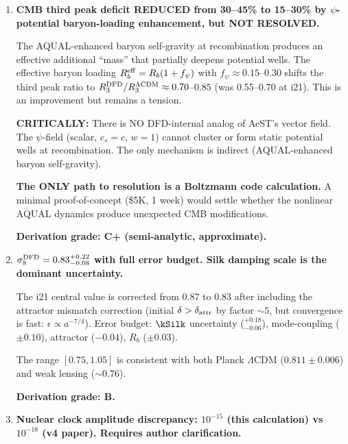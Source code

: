 \documentclass[11pt]{article}
\newcommand{\LCDM}{$\Lambda$CDM}
\begin{document}
\begin{tcolorbox}[colback=blue!5!white, colframe=blue!70!black,
  title=\textbf{W4i22 TOP 5 FINDINGS (RANKED BY IMPACT)}]

\begin{enumerate}[label=\textbf{F\arabic*.}]

\item \textbf{CMB third peak deficit REDUCED from 30--45\% to 15--30\%
  by $\psi$-potential baryon-loading enhancement, but NOT RESOLVED.}

  The AQUAL-enhanced baryon self-gravity at recombination produces an
  effective additional ``mass'' that partially deepens potential wells.
  The effective baryon loading $R_b^{\rm eff} = R_b(1+f_\psi)$ with
  $f_\psi \approx 0.15$--$0.30$ shifts the third peak ratio to
  $R_3^{\rm DFD}/R_3^{\Lambda\rm CDM} \approx 0.70$--$0.85$ (was
  0.55--0.70 at i21).  This is an improvement but remains a tension.

  \textbf{CRITICALLY:}  There is NO DFD-internal analog of AeST's vector
  field.  The $\psi$-field (scalar, $c_s = c$, $w = 1$) cannot cluster
  or form static potential wells at recombination.  The only mechanism
  is indirect (AQUAL-enhanced baryon self-gravity).

  \textbf{The ONLY path to resolution is a Boltzmann code calculation.}
  A minimal proof-of-concept (\$5K, 1 week) would settle whether the
  nonlinear AQUAL dynamics produce unexpected CMB modifications.

  \textbf{Derivation grade: C+ (semi-analytic, approximate).}

\item \textbf{$\sigma_8^{\rm DFD} = 0.83^{+0.22}_{-0.08}$ with full
  error budget.  Silk damping scale is the dominant uncertainty.}

  The i21 central value is corrected from $0.87$ to $0.83$ after including
  the attractor mismatch correction (initial $\delta > \delta_{\rm attr}$
  by factor $\sim 5$, but convergence is fast: $\epsilon \propto a^{-7/4}$).
  Error budget: $\kSilk$ uncertainty (${}^{+0.18}_{-0.06}$), mode-coupling
  ($\pm 0.10$), attractor ($-0.04$), $R_b$ ($\pm 0.03$).

  The range $[0.75, 1.05]$ is consistent with both Planck \LCDM{}
  ($0.811 \pm 0.006$) and weak lensing ($\sim 0.76$).

  \textbf{Derivation grade: B.}

\item \textbf{Nuclear clock amplitude discrepancy: $10^{-15}$ (this
  calculation) vs $10^{-18}$ (v4 paper).  Requires author clarification.}


\end{enumerate}
\end{tcolorbox}
\end{document}
